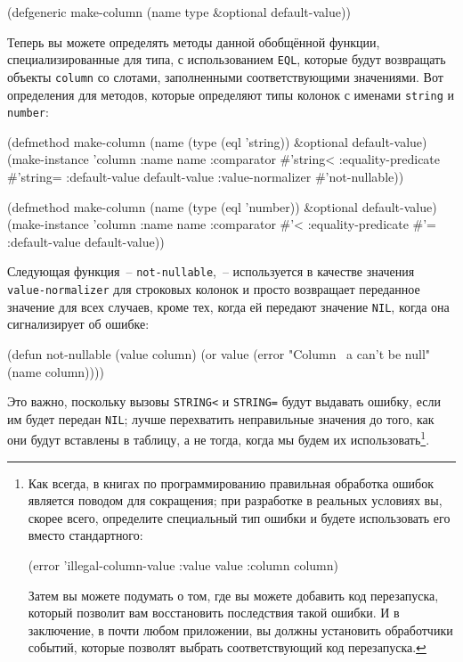 \begin{myverb}
(defgeneric make-column (name type &optional default-value))
\end{myverb}

Теперь вы можете определять методы данной обобщённой функции, специализированные для типа,
с использованием \lstinline{EQL}, которые будут возвращать объекты \lstinline{column} со слотами,
заполненными соответствующими значениями.  Вот определения для методов, которые определяют
типы колонок с именами \lstinline{string} и \lstinline{number}:

\begin{myverb}
(defmethod make-column (name (type (eql 'string)) &optional default-value)
  (make-instance
   'column 
   :name name
   :comparator #'string< 
   :equality-predicate #'string=
   :default-value default-value
   :value-normalizer #'not-nullable))

(defmethod make-column (name (type (eql 'number)) &optional default-value)
  (make-instance 
   'column
   :name name
   :comparator #'< 
   :equality-predicate #'=
   :default-value default-value))
\end{myverb}

Следующая функция~-- \lstinline{not-nullable},~-- используется в качестве значения
\lstinline{value-normalizer} для строковых колонок и просто возвращает переданное значение для
всех случаев, кроме тех, когда ей передают значение \lstinline{NIL}, когда она сигнализирует об
ошибке:

\begin{myverb}
(defun not-nullable (value column)
  (or value (error "Column ~a can't be null" (name column))))
\end{myverb}

Это важно, поскольку вызовы \lstinline{STRING<} и \lstinline{STRING=} будут выдавать ошибку, если им
будет передан \lstinline{NIL}; лучше перехватить неправильные значения до того, как они будут
вставлены в таблицу, а не тогда, когда мы будем их использовать\footnote{Как всегда, в
  книгах по программированию правильная обработка ошибок является поводом для сокращения;
  при разработке в реальных условиях вы, скорее всего, определите специальный тип ошибки и
  будете использовать его вместо стандартного:

\begin{myverb}
(error 'illegal-column-value :value value :column column)
\end{myverb}

Затем вы можете подумать о том, где вы можете добавить код перезапуска, который позволит
вам восстановить последствия такой ошибки.  И в заключение, в почти любом приложении, вы
должны установить обработчики событий, которые позволят выбрать соответствующий код
перезапуска.}.

